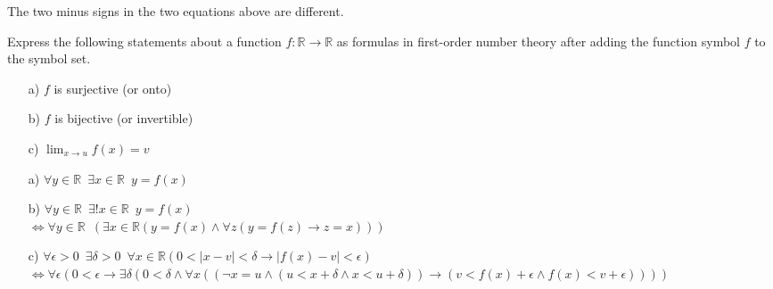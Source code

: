 \begin{rem}
The two minus signs in the two equations above are different.
\end{rem}



\begin{exmp}
Express the following statements about a function \(f\colon \mathbb{R}\to\mathbb{R}\) as formulas in first-order number theory after adding the function symbol \(f\) to the symbol set.
\end{exmp}


\begin{enumerate}
\item[a)] \(f\) is surjective (or onto)
\item[b)] \(f\) is bijective (or invertible)
\item[c)] \(\lim_{x\to u} f(x) = v\)
\end{enumerate}

\begin{solution}

\begin{enumerate}
\item[a)] \(\forall y\in\mathbb{R}\enspace \exists x\in \mathbb{R}\enspace y=f(x)\)
\item[b)] \(\forall y\in\mathbb{R}\enspace \exists! x\in \mathbb{R}\enspace y=f(x)\)\\
\(\iff \forall y\in\mathbb{R}\enspace (\exists x\in \mathbb{R}(y=f(x)\wedge \forall z (y=f(z)\to z=x)))\)
\item[c)] \(
\forall \epsilon > 0 \enspace \exists  \delta > 0 \enspace \forall x\in \mathbb{R} (0<|x-v|<\delta \to |f(x)-v|<\epsilon)
\)\\
\(
\iff 
\forall \epsilon (0<\epsilon \to \exists \delta (0<\delta \wedge \forall x ((\neg x = u \wedge (u < x+\delta \wedge x<u+\delta)) \to (v<f(x) + \epsilon \wedge f(x)<v+\epsilon))))
\)
\end{enumerate}
\end{solution}











